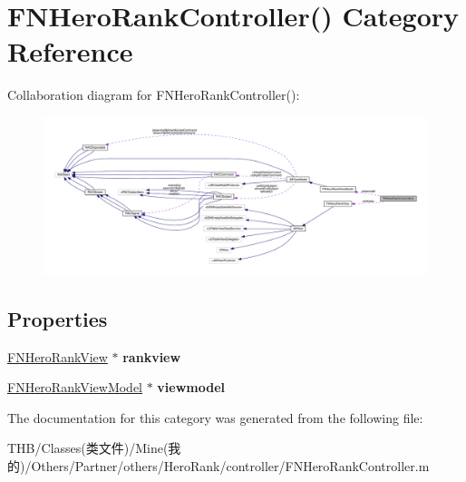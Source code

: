 \hypertarget{category_f_n_hero_rank_controller_07_08}{}\section{F\+N\+Hero\+Rank\+Controller() Category Reference}
\label{category_f_n_hero_rank_controller_07_08}


Collaboration diagram for F\+N\+Hero\+Rank\+Controller()\+:\nopagebreak
\begin{figure}[H]
\begin{center}
\leavevmode
\includegraphics[width=350pt]{category_f_n_hero_rank_controller_07_08__coll__graph}
\end{center}
\end{figure}
\subsection*{Properties}
\begin{DoxyCompactItemize}
\item 
\mbox{\label{category_f_n_hero_rank_controller_07_08_a111ba15dc6740eef47d55b64436aa33f}} 
\mbox{\hyperlink{interface_f_n_hero_rank_view}{F\+N\+Hero\+Rank\+View}} $\ast$ {\bfseries rankview}
\item 
\mbox{\label{category_f_n_hero_rank_controller_07_08_a4b08b3a60e2a81b5f468e53a54d0875d}} 
\mbox{\hyperlink{interface_f_n_hero_rank_view_model}{F\+N\+Hero\+Rank\+View\+Model}} $\ast$ {\bfseries viewmodel}
\end{DoxyCompactItemize}


The documentation for this category was generated from the following file\+:\begin{DoxyCompactItemize}
\item 
T\+H\+B/\+Classes(类文件)/\+Mine(我的)/\+Others/\+Partner/others/\+Hero\+Rank/controller/F\+N\+Hero\+Rank\+Controller.\+m\end{DoxyCompactItemize}
